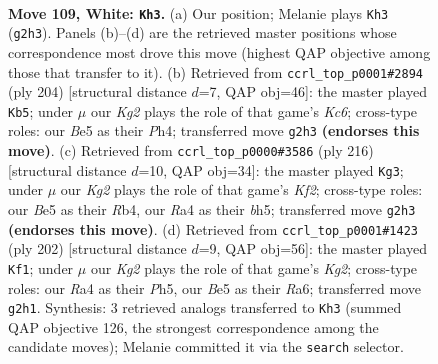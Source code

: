 \documentclass[11pt]{article}
\begin{document}
\clearpage

\begin{figure}[p]\centering
\begin{subfigure}{0.46\textwidth}\centering
\resizebox{\linewidth}{!}{%
\newchessgame
\chessboard[
  setfen={6r1/8/7k/4B3/R7/P7/6K1/8 w - - 10 109},
  showmover=false,
  pgfstyle=straightmove, color=movearrow, markmove={g2-h3}
]}
\caption{}
\end{subfigure}\hfill
\begin{subfigure}{0.46\textwidth}\centering
\resizebox{\linewidth}{!}{%
\newchessgame
\chessboard[
  setfen={1R6/1P4k1/2K5/8/7P/8/2r5/8 w - - 17 103},
  showmover=false,
  pgfstyle=straightmove, color=movearrow, markmove={c6-b5}
]}
\caption{}
\end{subfigure}
\\[4pt]
\begin{subfigure}{0.46\textwidth}\centering
\resizebox{\linewidth}{!}{%
\newchessgame
\chessboard[
  setfen={3B4/k7/8/7b/1R5P/8/2r2K2/8 w - - 24 109},
  showmover=false,
  pgfstyle=straightmove, color=movearrow, markmove={f2-g3}
]}
\caption{}
\end{subfigure}\hfill
\begin{subfigure}{0.46\textwidth}\centering
\resizebox{\linewidth}{!}{%
\newchessgame
\chessboard[
  setfen={8/8/R5P1/7P/5k2/2n5/1r4K1/8 w - - 5 102},
  showmover=false,
  pgfstyle=straightmove, color=movearrow, markmove={g2-f1}
]}
\caption{}
\end{subfigure}
\caption{\textbf{Move 109, White: \texttt{Kh3}.} (a) Our position; Melanie plays \texttt{Kh3} (\texttt{g2h3}). Panels (b)--(d) are the retrieved master positions whose correspondence most drove this move (highest QAP objective among those that transfer to it). (b) Retrieved from \texttt{ccrl\_top\_p0001\#2894} (ply 204) [structural distance $d$=7, QAP obj=46]: the master played \texttt{Kb5}; under $\mu$ our \emph{Kg2} plays the role of that game's \emph{Kc6}; cross-type roles: our \emph{B}e5 as their \emph{P}h4; transferred move \texttt{g2h3} \textbf{(endorses this move)}. (c) Retrieved from \texttt{ccrl\_top\_p0000\#3586} (ply 216) [structural distance $d$=10, QAP obj=34]: the master played \texttt{Kg3}; under $\mu$ our \emph{Kg2} plays the role of that game's \emph{Kf2}; cross-type roles: our \emph{B}e5 as their \emph{R}b4, our \emph{R}a4 as their \emph{b}h5; transferred move \texttt{g2h3} \textbf{(endorses this move)}. (d) Retrieved from \texttt{ccrl\_top\_p0001\#1423} (ply 202) [structural distance $d$=9, QAP obj=56]: the master played \texttt{Kf1}; under $\mu$ our \emph{Kg2} plays the role of that game's \emph{Kg2}; cross-type roles: our \emph{R}a4 as their \emph{P}h5, our \emph{B}e5 as their \emph{R}a6; transferred move \texttt{g2h1}. Synthesis: 3 retrieved analogs transferred to \texttt{Kh3} (summed QAP objective 126, the strongest correspondence among the candidate moves); Melanie committed it via the \texttt{search} selector.}
\label{fig:thought-m216}
\end{figure}
\end{document}
